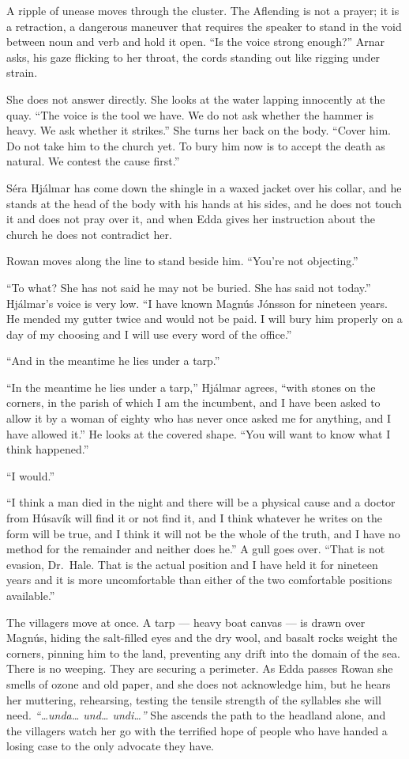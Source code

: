 \documentclass[11pt,oneside]{book}
\begin{document}
A ripple of unease moves through the cluster. The Aflending is not a
prayer; it is a retraction, a dangerous maneuver that requires the
speaker to stand in the void between noun and verb and hold it open.
``Is the voice strong enough?'' Arnar asks, his gaze flicking to her
throat, the cords standing out like rigging under strain.

She does not answer directly. She looks at the water lapping innocently
at the quay. ``The voice is the tool we have. We do not ask whether the
hammer is heavy. We ask whether it strikes.'' She turns her back on the
body. ``Cover him. Do not take him to the church yet. To bury him now is
to accept the death as natural. We contest the cause first.''

Séra Hjálmar has come down the shingle in a waxed jacket over his
collar, and he stands at the head of the body with his hands at his
sides, and he does not touch it and does not pray over it, and when Edda
gives her instruction about the church he does not contradict her.

Rowan moves along the line to stand beside him. ``You're not
objecting.''

``To what? She has not said he may not be buried. She has said not
today.'' Hjálmar's voice is very low. ``I have known Magnús Jónsson for
nineteen years. He mended my gutter twice and would not be paid. I will
bury him properly on a day of my choosing and I will use every word of
the office.''

``And in the meantime he lies under a tarp.''

``In the meantime he lies under a tarp,'' Hjálmar agrees, ``with stones
on the corners, in the parish of which I am the incumbent, and I have
been asked to allow it by a woman of eighty who has never once asked me
for anything, and I have allowed it.'' He looks at the covered shape.
``You will want to know what I think happened.''

``I would.''

``I think a man died in the night and there will be a physical cause and
a doctor from Húsavík will find it or not find it, and I think whatever
he writes on the form will be true, and I think it will not be the
whole of the truth, and I have no method for the remainder and neither
does he.'' A gull goes over. ``That is not evasion, Dr.~Hale. That is
the actual position and I have held it for nineteen years and it is more
uncomfortable than either of the two comfortable positions available.''

The villagers move at once. A tarp --- heavy boat canvas --- is drawn
over Magnús, hiding the salt-filled eyes and the dry wool, and basalt
rocks weight the corners, pinning him to the land, preventing any drift
into the domain of the sea. There is no weeping. They are securing a
perimeter. As Edda passes Rowan she smells of ozone and old paper, and
she does not acknowledge him, but he hears her muttering, rehearsing,
testing the tensile strength of the syllables she will need.
\emph{``\ldots unda\ldots{} und\ldots{} undi\ldots{}''} She ascends the
path to the headland alone, and the villagers watch her go with the
terrified hope of people who have handed a losing case to the only
advocate they have.
\end{document}
